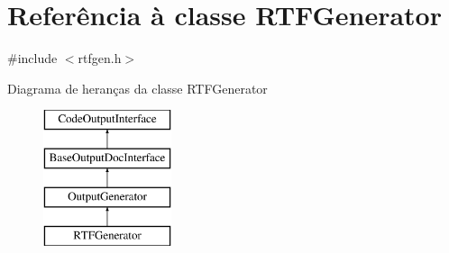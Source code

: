\hypertarget{class_r_t_f_generator}{\section{Referência à classe R\-T\-F\-Generator}
\label{class_r_t_f_generator}
}


{\ttfamily \#include $<$rtfgen.\-h$>$}

Diagrama de heranças da classe R\-T\-F\-Generator\begin{figure}[H]
\begin{center}
\leavevmode
\includegraphics[height=4.000000cm]{class_r_t_f_generator}
\end{center}
\end{figure}
